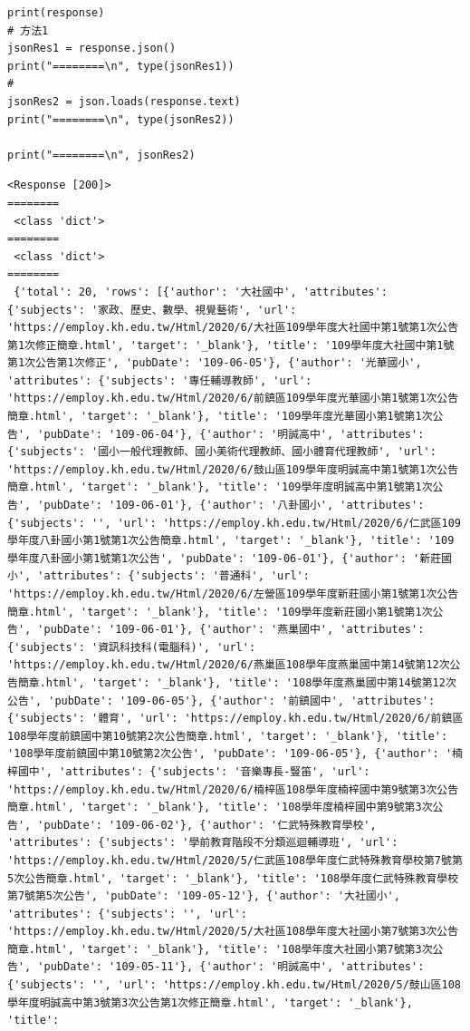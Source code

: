 \documentclass[a4paper,12pt]{article}
\begin{document}
\begin{enumerate}
\begin{lstlisting}
print(response)
# 方法1
jsonRes1 = response.json()
print("========\n", type(jsonRes1))
# 
jsonRes2 = json.loads(response.text)
print("========\n", type(jsonRes2))

print("========\n", jsonRes2)
\end{lstlisting}

\begin{verbatim}
<Response [200]>
========
 <class 'dict'>
========
 <class 'dict'>
========
 {'total': 20, 'rows': [{'author': '大社國中', 'attributes': {'subjects': '家政、歷史、數學、視覺藝術', 'url': 'https://employ.kh.edu.tw/Html/2020/6/大社區109學年度大社國中第1號第1次公告第1次修正簡章.html', 'target': '_blank'}, 'title': '109學年度大社國中第1號第1次公告第1次修正', 'pubDate': '109-06-05'}, {'author': '光華國小', 'attributes': {'subjects': '專任輔導教師', 'url': 'https://employ.kh.edu.tw/Html/2020/6/前鎮區109學年度光華國小第1號第1次公告簡章.html', 'target': '_blank'}, 'title': '109學年度光華國小第1號第1次公告', 'pubDate': '109-06-04'}, {'author': '明誠高中', 'attributes': {'subjects': '國小一般代理教師、國小美術代理教師、國小體育代理教師', 'url': 'https://employ.kh.edu.tw/Html/2020/6/鼓山區109學年度明誠高中第1號第1次公告簡章.html', 'target': '_blank'}, 'title': '109學年度明誠高中第1號第1次公告', 'pubDate': '109-06-01'}, {'author': '八卦國小', 'attributes': {'subjects': '', 'url': 'https://employ.kh.edu.tw/Html/2020/6/仁武區109學年度八卦國小第1號第1次公告簡章.html', 'target': '_blank'}, 'title': '109學年度八卦國小第1號第1次公告', 'pubDate': '109-06-01'}, {'author': '新莊國小', 'attributes': {'subjects': '普通科', 'url': 'https://employ.kh.edu.tw/Html/2020/6/左營區109學年度新莊國小第1號第1次公告簡章.html', 'target': '_blank'}, 'title': '109學年度新莊國小第1號第1次公告', 'pubDate': '109-06-01'}, {'author': '燕巢國中', 'attributes': {'subjects': '資訊科技科(電腦科)', 'url': 'https://employ.kh.edu.tw/Html/2020/6/燕巢區108學年度燕巢國中第14號第12次公告簡章.html', 'target': '_blank'}, 'title': '108學年度燕巢國中第14號第12次公告', 'pubDate': '109-06-05'}, {'author': '前鎮國中', 'attributes': {'subjects': '體育', 'url': 'https://employ.kh.edu.tw/Html/2020/6/前鎮區108學年度前鎮國中第10號第2次公告簡章.html', 'target': '_blank'}, 'title': '108學年度前鎮國中第10號第2次公告', 'pubDate': '109-06-05'}, {'author': '楠梓國中', 'attributes': {'subjects': '音樂專長-豎笛', 'url': 'https://employ.kh.edu.tw/Html/2020/6/楠梓區108學年度楠梓國中第9號第3次公告簡章.html', 'target': '_blank'}, 'title': '108學年度楠梓國中第9號第3次公告', 'pubDate': '109-06-02'}, {'author': '仁武特殊教育學校', 'attributes': {'subjects': '學前教育階段不分類巡迴輔導班', 'url': 'https://employ.kh.edu.tw/Html/2020/5/仁武區108學年度仁武特殊教育學校第7號第5次公告簡章.html', 'target': '_blank'}, 'title': '108學年度仁武特殊教育學校第7號第5次公告', 'pubDate': '109-05-12'}, {'author': '大社國小', 'attributes': {'subjects': '', 'url': 'https://employ.kh.edu.tw/Html/2020/5/大社區108學年度大社國小第7號第3次公告簡章.html', 'target': '_blank'}, 'title': '108學年度大社國小第7號第3次公告', 'pubDate': '109-05-11'}, {'author': '明誠高中', 'attributes': {'subjects': '', 'url': 'https://employ.kh.edu.tw/Html/2020/5/鼓山區108學年度明誠高中第3號第3次公告第1次修正簡章.html', 'target': '_blank'}, 'title': 
\end{verbatim}
\end{enumerate}
\end{document}
